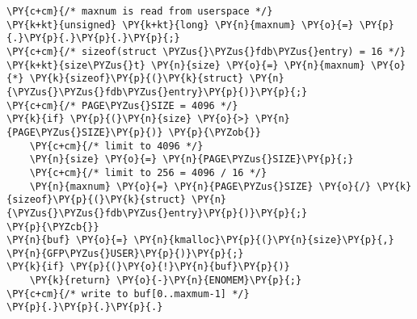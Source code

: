 \begin{Verbatim}[commandchars=\\\{\}]
\PY{c+cm}{/* maxnum is read from userspace */}
\PY{k+kt}{unsigned} \PY{k+kt}{long} \PY{n}{maxnum} \PY{o}{=} \PY{p}{.}\PY{p}{.}\PY{p}{.}\PY{p}{;}
\PY{c+cm}{/* sizeof(struct \PYZus{}\PYZus{}fdb\PYZus{}entry) = 16 */}
\PY{k+kt}{size\PYZus{}t} \PY{n}{size} \PY{o}{=} \PY{n}{maxnum} \PY{o}{*} \PY{k}{sizeof}\PY{p}{(}\PY{k}{struct} \PY{n}{\PYZus{}\PYZus{}fdb\PYZus{}entry}\PY{p}{)}\PY{p}{;}
\PY{c+cm}{/* PAGE\PYZus{}SIZE = 4096 */}
\PY{k}{if} \PY{p}{(}\PY{n}{size} \PY{o}{>} \PY{n}{PAGE\PYZus{}SIZE}\PY{p}{)} \PY{p}{\PYZob{}}
	\PY{c+cm}{/* limit to 4096 */}
	\PY{n}{size} \PY{o}{=} \PY{n}{PAGE\PYZus{}SIZE}\PY{p}{;}
	\PY{c+cm}{/* limit to 256 = 4096 / 16 */}
	\PY{n}{maxnum} \PY{o}{=} \PY{n}{PAGE\PYZus{}SIZE} \PY{o}{/} \PY{k}{sizeof}\PY{p}{(}\PY{k}{struct} \PY{n}{\PYZus{}\PYZus{}fdb\PYZus{}entry}\PY{p}{)}\PY{p}{;}
\PY{p}{\PYZcb{}}
\PY{n}{buf} \PY{o}{=} \PY{n}{kmalloc}\PY{p}{(}\PY{n}{size}\PY{p}{,} \PY{n}{GFP\PYZus{}USER}\PY{p}{)}\PY{p}{;}
\PY{k}{if} \PY{p}{(}\PY{o}{!}\PY{n}{buf}\PY{p}{)}
	\PY{k}{return} \PY{o}{-}\PY{n}{ENOMEM}\PY{p}{;}
\PY{c+cm}{/* write to buf[0..maxmum-1] */}
\PY{p}{.}\PY{p}{.}\PY{p}{.}
\end{Verbatim}
